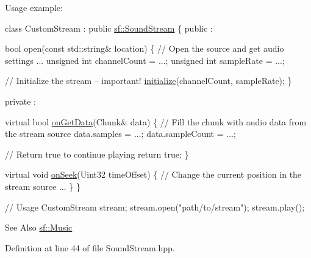 Usage example\-: 
\begin{DoxyCode}
\textcolor{keyword}{class }CustomStream : \textcolor{keyword}{public} \hyperlink{classsf_1_1SoundStream}{sf::SoundStream}
\{
\textcolor{keyword}{public} :

    \textcolor{keywordtype}{bool} open(\textcolor{keyword}{const} std::string& location)
    \{
        \textcolor{comment}{// Open the source and get audio settings}
        ...
        \textcolor{keywordtype}{unsigned} \textcolor{keywordtype}{int} channelCount = ...;
        \textcolor{keywordtype}{unsigned} \textcolor{keywordtype}{int} sampleRate = ...;

        \textcolor{comment}{// Initialize the stream -- important!}
        \hyperlink{classsf_1_1SoundStream_a9c351711198ee1aa77c2fefd3ced4d2c}{initialize}(channelCount, sampleRate);
    \}

\textcolor{keyword}{private} :

    \textcolor{keyword}{virtual} \textcolor{keywordtype}{bool} \hyperlink{classsf_1_1SoundStream_a968ec024a6e45490962c8a1121cb7c5f}{onGetData}(Chunk& data)
    \{
        \textcolor{comment}{// Fill the chunk with audio data from the stream source}
        data.samples = ...;
        data.sampleCount = ...;

        \textcolor{comment}{// Return true to continue playing}
        \textcolor{keywordflow}{return} \textcolor{keyword}{true};
    \}

    \textcolor{keyword}{virtual} \textcolor{keywordtype}{void} \hyperlink{classsf_1_1SoundStream_a907036dd2ca7d3af5ead316e54b75997}{onSeek}(Uint32 timeOffset)
    \{
        \textcolor{comment}{// Change the current position in the stream source}
        ...
    \}
\}

\textcolor{comment}{// Usage}
CustomStream stream;
stream.open(\textcolor{stringliteral}{"path/to/stream"});
stream.play();
\end{DoxyCode}


\begin{DoxySeeAlso}{See Also}
\hyperlink{classsf_1_1Music}{sf\-::\-Music} 
\end{DoxySeeAlso}


Definition at line 44 of file Sound\-Stream.\-hpp.




